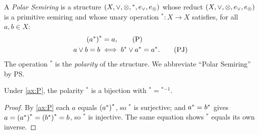 \begin{definition}\label{def:ps}
A \emph{Polar Semiring} is a structure $(X,\vee,\otimes,{}^{*},e_{\vee},e_{\otimes})$
whose reduct $(X,\vee,\otimes,e_{\vee},e_{\otimes})$ is a primitive semiring and whose
unary operation ${}^{*}\colon X \to X$ satisfies, for all $a,b \in X$:
\begin{align}
  {({a}^{*})}^{*} &= a, \tag{P}\label{ax:P}\\
  a \vee b = b \;&\Longleftrightarrow\; {b}^{*} \vee {a}^{*} = {a}^{*}.
    \tag{PJ}\label{ax:PJ}
\end{align}
The operation ${}^{*}$ is the \emph{polarity} of the structure. We
abbreviate ``Polar Semiring'' by PS.
\end{definition}




\begin{proposition}\label{prop:role-P}
Under \eqref{ax:P}, the polarity ${}^{*}$ is a bijection with
${}^{*} = {}^{*}{}^{-1}$.
\end{proposition}

\begin{proof}
By \eqref{ax:P} each $a$ equals ${({a}^{*})}^{*}$, so ${}^{*}$ is
surjective; and ${a}^{*} = {b}^{*}$ gives
$a = {({a}^{*})}^{*} = {({b}^{*})}^{*} = b$, so ${}^{*}$ is
injective. The same equation shows ${}^{*}$ equals its own inverse.
\end{proof}

